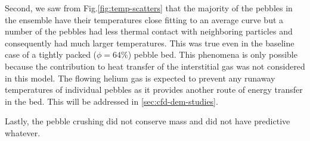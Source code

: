 Second, we saw from Fig.\ref{fig:temp-scatters} that the majority of the pebbles in the ensemble have their temperatures close fitting to an average curve but a number of the pebbles had less thermal contact with neighboring particles and consequently had much larger temperatures. This was true even in the baseline case of a tightly packed ($\phi = 64\%$) pebble bed. This phenomena is only possible because the contribution to heat transfer of the interstitial gas was not considered in this model. The flowing helium gas is expected to prevent any runaway temperatures of individual pebbles as it provides another route of energy transfer in the bed. This will be addressed in \cref{sec:cfd-dem-studies}.

Lastly, the pebble crushing did not conserve mass and did not have predictive whatever.